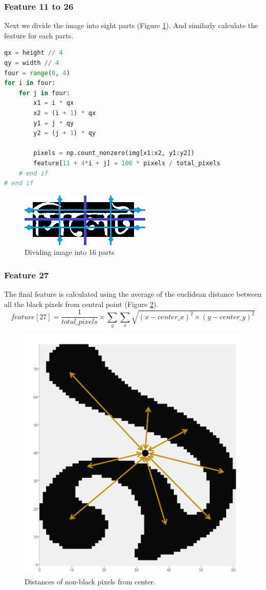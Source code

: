 \documentclass{standalone}
\begin{document}
\subsubsection{Feature 11 to 26}
Next we divide the image into eight parts (Figure \ref{fig:FeatureEights}). And similarly calculate the feature for each parts.
\begin{lstlisting}[language=Python]
qx = height // 4
qy = width // 4
four = range(0, 4)
for i in four:
    for j in four:
        x1 = i * qx
        x2 = (i + 1) * qx
        y1 = j * qy
        y2 = (j + 1) * qy

        pixels = np.count_nonzero(img[x1:x2, y1:y2])
        feature[11 + 4*i + j] = 100 * pixels / total_pixels
    # end if
# end if
\end{lstlisting}

\begin{figure}
\centering
\includegraphics{./img/feature/eights}
\caption{Dividing image into 16 parts}
\label{fig:FeatureEights}
\end{figure}

\subsubsection{Feature 27}
The final feature is calculated using the average of the euclidean distance between all the black pixels from central point (Figure \ref{fig:FeatureDist}).
\begin{equation}
feature[27] = \dfrac{1}{total\_pixels} \times \sum_{y}{\sum_{x}{ \sqrt{(x-center\_x)^2 \times (y-center\_y)^2} }}
\end{equation}


\begin{figure}
\centering
\includegraphics[width=0.8\linewidth]{./img/feature/dist}
\caption{Distances of non-black pixels from center.}
\label{fig:FeatureDist}
\end{figure}
\end{document}
